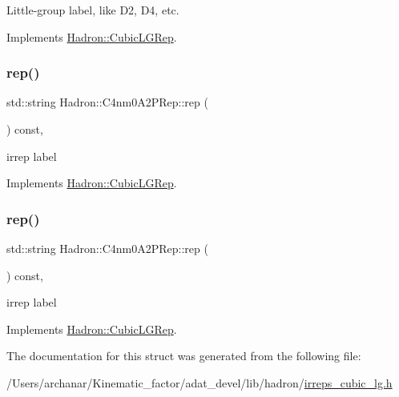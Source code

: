 Little-\/group label, like D2, D4, etc. 

Implements \mbox{\hyperlink{structHadron_1_1CubicLGRep_a9bdb14b519a611d21379ed96a3a9eb41}{Hadron\+::\+Cubic\+L\+G\+Rep}}.

\mbox{\label{structHadron_1_1C4nm0A2PRep_a0a9ce5aff0ffd7d30bc9137951983b54}} 
\subsubsection{\texorpdfstring{rep()}{rep()}\hspace{0.1cm}{\footnotesize\ttfamily [1/2]}}
{\footnotesize\ttfamily std\+::string Hadron\+::\+C4nm0\+A2\+P\+Rep\+::rep (\begin{DoxyParamCaption}{ }\end{DoxyParamCaption}) const\hspace{0.3cm}{\ttfamily [inline]}, {\ttfamily [virtual]}}

irrep label 

Implements \mbox{\hyperlink{structHadron_1_1CubicLGRep_a50f5ddbb8f4be4cee0106fa9e8c75e6c}{Hadron\+::\+Cubic\+L\+G\+Rep}}.

\mbox{\label{structHadron_1_1C4nm0A2PRep_a0a9ce5aff0ffd7d30bc9137951983b54}} 
\subsubsection{\texorpdfstring{rep()}{rep()}\hspace{0.1cm}{\footnotesize\ttfamily [2/2]}}
{\footnotesize\ttfamily std\+::string Hadron\+::\+C4nm0\+A2\+P\+Rep\+::rep (\begin{DoxyParamCaption}{ }\end{DoxyParamCaption}) const\hspace{0.3cm}{\ttfamily [inline]}, {\ttfamily [virtual]}}

irrep label 

Implements \mbox{\hyperlink{structHadron_1_1CubicLGRep_a50f5ddbb8f4be4cee0106fa9e8c75e6c}{Hadron\+::\+Cubic\+L\+G\+Rep}}.



The documentation for this struct was generated from the following file\+:\begin{DoxyCompactItemize}
\item 
/\+Users/archanar/\+Kinematic\+\_\+factor/adat\+\_\+devel/lib/hadron/\mbox{\hyperlink{lib_2hadron_2irreps__cubic__lg_8h}{irreps\+\_\+cubic\+\_\+lg.\+h}}\end{DoxyCompactItemize}
